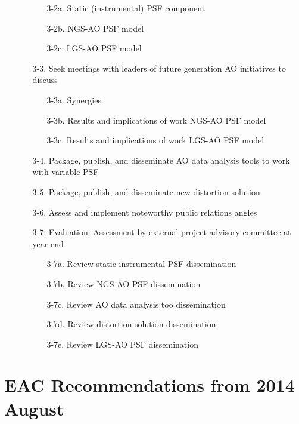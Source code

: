 \begin{itemize}
\begin{itemize}
\begin{itemize}
    \item[3-2a.] Static (instrumental) PSF component
    \item[3-2b.] NGS-AO PSF model
    \item[3-2c.] LGS-AO PSF model
    \end{itemize}
  \item[3-3.] Seek meetings with leaders of future generation AO
    initiatives to discuss
    \begin{itemize}
    \item[3-3a.] Synergies
    \item[3-3b.] Results and implications of work NGS-AO PSF model 
    \item[3-3c.] Results and implications of work LGS-AO PSF model
    \end{itemize}
  \item[3-4.] Package, publish, and disseminate AO data analysis tools
    to work with variable PSF
  \item[3-5.] Package, publish, and disseminate new distortion solution
  \item[3-6.] Assess and implement noteworthy public relations angles
  \item[3-7.] Evaluation: Assessment by external project advisory
    committee at year end 
    \begin{itemize}
    \item[3-7a.] Review static instrumental PSF dissemination
    \item[3-7b.] Review NGS-AO PSF dissemination
    \item[3-7c.] Review AO data analysis too dissemination
    \item[3-7d.] Review distortion solution dissemination
    \item[3-7e.] Review LGS-AO PSF dissemination
    \end{itemize}
  \end{itemize}
\end{itemize}
    

\section{EAC Recommendations from 2014 August}  

